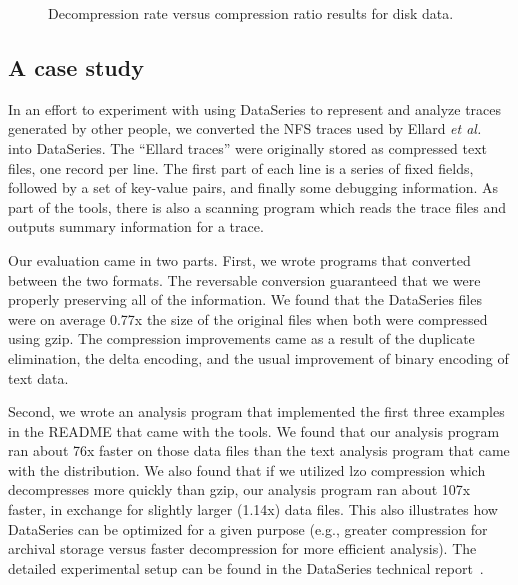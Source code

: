 \documentclass{acm_proc_article-sp}
\begin{document}
\begin{figure}[tbh]
\caption{ Decompression rate versus compression ratio results for disk data.}
\label{fig:decomRateRatios}
\end{figure}

\subsection{A case study}\label{sec:ellard}

In an effort to experiment with using DataSeries to represent and
analyze traces generated by other people, we converted the NFS
traces used by Ellard \textit{et al.}~\cite{ellard03} into DataSeries.  
The ``Ellard traces''
were originally stored as compressed text files, one record per line.
The first part of each line is a series of fixed fields, followed by a
set of key-value pairs, and finally some debugging information.  As
part of the tools, there is also a scanning program which reads the
trace files and outputs summary information for a trace.

Our evaluation came in two parts.  First, we wrote programs that
converted between the two formats.  The reversable conversion
guaranteed that we were properly preserving all of the information.
We found that the DataSeries files were on average 0.77x the size of
the original files when both were compressed using gzip.  The
compression improvements came as a result of the duplicate
elimination, the delta encoding, and the usual improvement of binary
encoding of text data.

Second, we
wrote an analysis program that implemented the first three examples in
the README that came with the tools.  We found that our analysis
program ran about 76x faster on those data files than the text
analysis program that came with the distribution.  We also found that
if we utilized lzo compression which decompresses more quickly than
gzip, our analysis program ran about 107x faster, in exchange for
slightly larger (1.14x) data files.  This also illustrates how
DataSeries can be optimized for a given purpose (e.g., greater
compression for archival storage versus faster decompression for more
efficient analysis). The detailed experimental setup can be found in
the DataSeries technical report~\cite{DSTechnicalReportSnapshot}.
\end{document}
